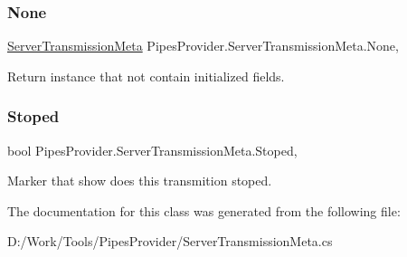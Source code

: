 \mbox{\label{class_pipes_provider_1_1_server_transmission_meta_aad6b35f35e7976ae9ee3f386b65dd128}} 
\subsubsection{\texorpdfstring{None}{None}}
{\footnotesize\ttfamily \mbox{\hyperlink{class_pipes_provider_1_1_server_transmission_meta}{Server\+Transmission\+Meta}} Pipes\+Provider.\+Server\+Transmission\+Meta.\+None\hspace{0.3cm}{\ttfamily [static]}, {\ttfamily [get]}}



Return instance that not contain initialized fields. 

\mbox{\label{class_pipes_provider_1_1_server_transmission_meta_a9b501faba9c2cb9ed8873f1935d95b7c}} 
\subsubsection{\texorpdfstring{Stoped}{Stoped}}
{\footnotesize\ttfamily bool Pipes\+Provider.\+Server\+Transmission\+Meta.\+Stoped\hspace{0.3cm}{\ttfamily [get]}, {}}



Marker that show does this transmition stoped. 



The documentation for this class was generated from the following file\+:\begin{DoxyCompactItemize}
\item 
D\+:/\+Work/\+Tools/\+Pipes\+Provider/Server\+Transmission\+Meta.\+cs\end{DoxyCompactItemize}
